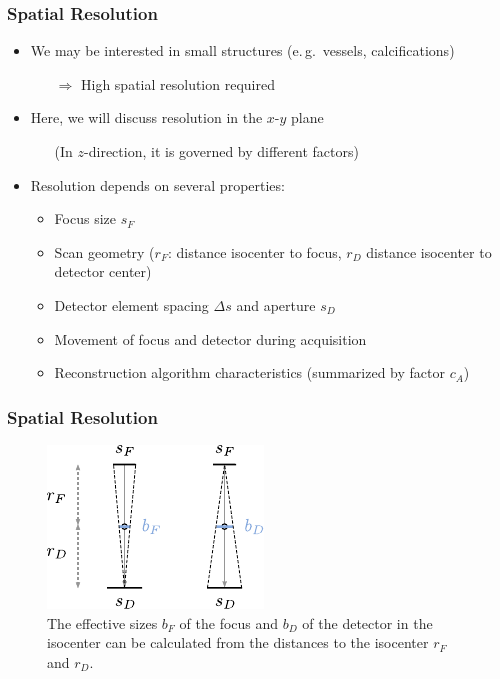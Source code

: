 \begin{frame}
	\frametitle{Spatial Resolution}

	\begin{itemize}
		\setlength\itemsep{0.3cm}
		\item We may be interested in small structures (e.\,g.~vessels, calcifications)
		      \begin{itemize}
			      \item[$\Rightarrow$] High spatial resolution required
		      \end{itemize}
		\item Here, we will discuss resolution in the $x$-$y$ plane
		      \begin{itemize}
			      \item[ ] (In $z$-direction, it is governed by different factors)
		      \end{itemize}
		\item Resolution depends on several properties:
		      \begin{itemize}
			      \item Focus size $s_F$
			      \item Scan geometry ($r_F$: distance isocenter to focus, $r_D$ distance isocenter to detector center)
			      \item Detector element spacing $\Delta s$ and aperture $s_D$
			      \item Movement of focus and detector during acquisition
			      \item Reconstruction algorithm characteristics (summarized by factor $c_A$)
		      \end{itemize}
	\end{itemize}

\end{frame}

\begin{frame}
	\frametitle{Spatial Resolution}

	\begin{figure}
		\begin{center}
			\includegraphics[width=0.5\linewidth]{images/resolution_3}
		\end{center}
		\caption{The effective sizes $b_F$ of the focus and $b_D$ of the detector in the isocenter can be calculated from the distances to the isocenter $r_F$ and $r_D$.}
		\label{fig:ct_resolution_3}
	\end{figure}

\end{frame}



